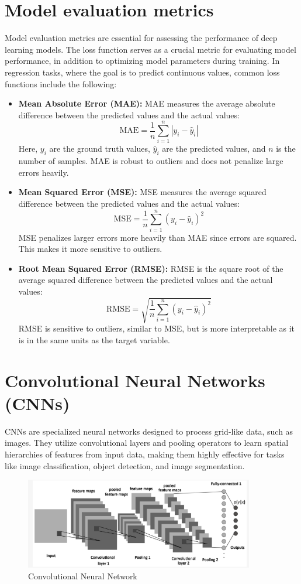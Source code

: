 \section{Model evaluation metrics}
Model evaluation metrics are essential for assessing the performance of deep learning models. The loss function serves as a crucial metric for evaluating model performance, in addition to optimizing model parameters during training. In regression tasks, where the goal is to predict continuous values, common loss functions include the following:
\begin{itemize}
\item \textbf{Mean Absolute Error (MAE):} MAE measures the average absolute difference between the predicted values and the actual values:\[ \text{MAE} = \frac{1}{n} \sum_{i=1}^{n} |y_i - \hat{y}_i| \] Here, $y_i$ are the ground truth values, $\hat{y}_i$ are the predicted values, and $n$ is the number of samples. MAE is robust to outliers and does not penalize large errors heavily.
\item \textbf{Mean Squared Error (MSE):} MSE measures the average squared difference between the predicted values and the actual values:\[ \text{MSE} = \frac{1}{n} \sum_{i=1}^{n} (y_i - \hat{y}_i)^2 \] MSE penalizes larger errors more heavily than MAE since errors are squared. This makes it more sensitive to outliers. 
\item \textbf{Root Mean Squared Error (RMSE):} RMSE is the square root of the average squared difference between the predicted values and the actual values: \[ \text{RMSE} = \sqrt{\frac{1}{n} \sum_{i=1}^{n} (y_i - \hat{y}_i)^2} \]RMSE is sensitive to outliers, similar to MSE, but is more interpretable as it is in the same units as the target variable.
\end{itemize}
\section{Convolutional Neural Networks (CNNs)}
CNNs are specialized neural networks designed to process grid-like data, such as images. They utilize convolutional layers and pooling operators to learn spatial hierarchies of features from input data, making them highly effective for tasks like image classification, object detection, and image segmentation.
\begin{figure}[ht]
    \centering
    \includegraphics[width=10cm]{images/Theory-DL/CNN.png}
    \caption{Convolutional Neural Network}
    \label{fig:CNN}
  \end{figure}
